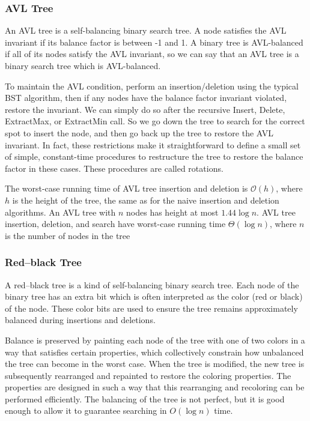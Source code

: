 \documentclass{article}
\newcommand{\bigO}{\ensuremath{\mathcal{O}}}
\begin{document}
    \subsubsection{AVL Tree}
    An AVL tree is a self-balancing binary search tree. A node satisfies the AVL invariant if its balance factor is between -1 and 1. A binary tree is AVL-balanced if all of its nodes satisfy the AVL invariant, so we can say that an AVL tree is a binary search tree which is AVL-balanced. 
    
    To maintain the AVL condition, perform an insertion/deletion using the typical BST algorithm, then if any nodes have the balance factor invariant violated, restore the invariant. We can simply do so after the recursive Insert, Delete, ExtractMax, or ExtractMin call. So we go down the tree to search for the correct spot to insert the node, and then go back up the tree to restore the AVL invariant. In fact, these restrictions make it straightforward to define a small set of simple, constant-time procedures to restructure the tree to restore the balance factor in these cases. These procedures are called rotations.
    
    The worst-case running time of AVL tree insertion and deletion is $\bigO(h)$, where $h$ is the height of the tree, the same as for the naive insertion and deletion algorithms. An AVL tree with $n$ nodes has height at most $1.44 \log n$. AVL tree insertion, deletion, and search have worst-case running time $\Theta(\log n)$, where $n$ is the number of nodes in the tree
    
    \subsubsection{Red–black Tree}
    A red–black tree is a kind of self-balancing binary search tree. Each node of the binary tree has an extra bit which is often interpreted as the color (red or black) of the node. These color bits are used to ensure the tree remains approximately balanced during insertions and deletions.
    
    Balance is preserved by painting each node of the tree with one of two colors in a way that satisfies certain properties, which collectively constrain how unbalanced the tree can become in the worst case. When the tree is modified, the new tree is subsequently rearranged and repainted to restore the coloring properties. The properties are designed in such a way that this rearranging and recoloring can be performed efficiently. The balancing of the tree is not perfect, but it is good enough to allow it to guarantee searching in $O(\log n)$ time.
    
\end{document}
